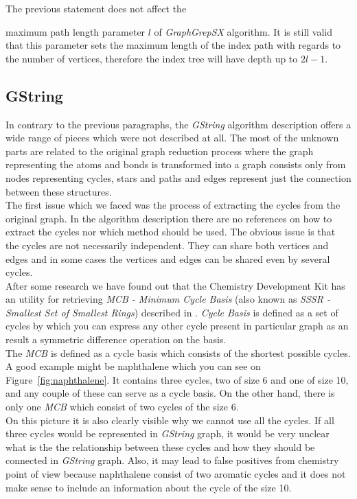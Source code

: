 The previous statement does not affect the {maximum path length parameter $l$ of \textit{GraphGrepSX} algorithm. It is still valid that this parameter sets the maximum length of the index path with regards to the number of vertices, therefore the index tree will have depth up to $2l - 1$.

\subsection{GString}

In contrary to the previous paragraphs, the \textit{GString} algorithm description offers a wide range of pieces which were not described at all. The most of the unknown parts are related to the original graph reduction process where the graph representing the atoms and bonds is transformed into a graph consists only from nodes representing cycles, stars and paths and edges represent just the connection between these structures.\\

The first issue which we faced was the process of extracting the cycles from the original graph. In the algorithm description there are no references on how to extract the cycles nor which method should be used. The obvious issue is that the cycles are not necessarily independent. They can share both vertices and edges and in some cases the vertices and edges can be shared even by several cycles.\\

After some research we have found out that the Chemistry Development Kit has an utility for retrieving \textit{MCB - Minimum Cycle Basis} (also known as \textit{SSSR - Smallest Set of Smallest Rings}) described in \cite{Bauer}. \textit{Cycle Basis} is defined as a set of cycles by which you can express any other cycle present in particular graph as an result a symmetric difference operation on the basis.\\

The \textit{MCB} is defined as a cycle basis which consists of the shortest possible cycles. A good example might be naphthalene which you can see on Figure~\ref{fig:naphthalene}. It contains three cycles, two of size 6 and one of size 10, and any couple of these can serve as a cycle basis. On the other hand, there is only one \textit{MCB} which consist of two cycles of the size 6.\\

On this picture it is also clearly visible why we cannot use all the cycles. If all three cycles would be represented in \textit{GString} graph, it would be very unclear what is the the relationship between these cycles and how they should be connected in \textit{GString} graph. Also, it may lead to false positives from chemistry point of view because naphthalene consist of two aromatic cycles and it does not make sense to include an information about the cycle of the size 10.

}
